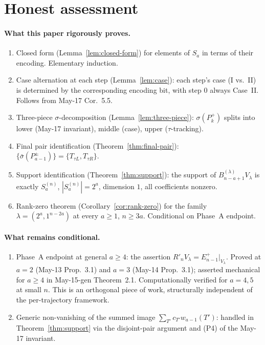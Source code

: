 \documentclass[11pt]{article}
\theoremstyle{definition}
\begin{document}
\section{Honest assessment}\label{sec:honest}

\paragraph{What this paper rigorously proves.}
\begin{enumerate}[leftmargin=2em,topsep=0.3em,itemsep=0.2em]
\item Closed form (Lemma~\ref{lem:closed-form}) for elements of
$S_a$ in terms of their encoding.  Elementary induction.
\item Case alternation at each step (Lemma~\ref{lem:case}): each
step's case (I vs.\ II) is determined by the corresponding encoding
bit, with step $0$ always Case~II.  Follows from May-17 Cor.~5.5.
\item Three-piece $\sigma$-decomposition (Lemma~\ref{lem:three-piece}):
$\sigma(P_k^+)$ splits into lower (May-17 invariant), middle (case),
upper ($\tau$-tracking).
\item Final pair identification (Theorem~\ref{thm:final-pair}):
$\{\bar\sigma(P_{a-1}^\pm)\}=\{T_{\tau L},T_{\tau R}\}$.
\item Support identification (Theorem~\ref{thm:support}): the
support of $B_{n-a+1}^{(\lambda)}V_\lambda$ is exactly $S_a^{(n)}$,
$|S_a^{(n)}|=2^a$, dimension $1$, all coefficients nonzero.
\item Rank-zero theorem (Corollary~\ref{cor:rank-zero}) for the
family $\lambda=(2^a,1^{n-2a})$ at every $a\ge 1$, $n\ge 3a$.
Conditional on Phase~A endpoint.
\end{enumerate}

\paragraph{What remains conditional.}
\begin{enumerate}[leftmargin=2em,topsep=0.3em,itemsep=0.2em]
\item Phase~A endpoint at general $a\ge 4$: the assertion
$R'_nV_\lambda=E_{n-1}^+|_{V_\lambda}$.  Proved at $a=2$ (May-13
Prop.~3.1) and $a=3$ (May-14 Prop.~3.1); asserted mechanical for
$a\ge 4$ in May-15-gen Theorem~2.1.  Computationally verified for
$a=4,5$ at small $n$.  This is an orthogonal piece of work,
structurally independent of the per-trajectory framework.
\item Generic non-vanishing of the summed image
$\sum_{T'}c_{T'}w_{a-1}(T')$: handled in Theorem~\ref{thm:support}
via the disjoint-pair argument and (P4) of the May-17 invariant.
\end{enumerate}
\end{document}
